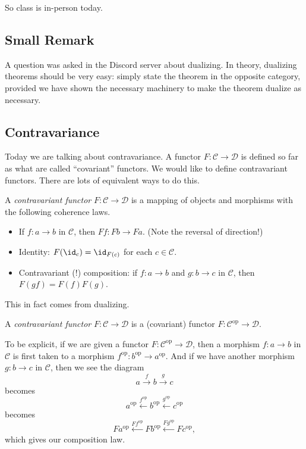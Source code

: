 \documentclass[../notes.tex]{subfiles}
\begin{document}

So class is in-person today.

\subsection{Small Remark}
A question was asked in the Discord server about dualizing. In theory, dualizing theorems should be very easy: simply state the theorem in the opposite category, provided we have shown the necessary machinery to make the theorem dualize as necessary.

\subsection{Contravariance}
Today we are talking about contravariance. A functor $F:\mathcal C\to\mathcal D$ is defined so far as what are called ``covariant'' functors. We would like to define contravariant functors. There are lots of equivalent ways to do this.
\begin{definition}[Contravariance, I]
	A \textit{contravariant functor} $F:\mathcal C\to\mathcal D$ is a mapping of objects and morphisms with the following coherence laws.
	\begin{itemize}
		\item If $f:a\to b$ in $\mathcal C$, then $Ff:Fb\to Fa$. (Note the reversal of direction!)
		\item Identity: $F(\id_c)=\id_{F(c)}$ for each $c\in\mathcal C$.
		\item Contravariant (!) composition: if $f:a\to b$ and $g:b\to c$ in $\mathcal C$, then $F(gf)=F(f)F(g)$.
	\end{itemize}
\end{definition}
This in fact comes from dualizing.
\begin{definition}[Contravariance, II] \label{def:contra}
	A \textit{contravariant functor} $F:\mathcal C\to\mathcal D$ is a (covariant) functor $F:\mathcal C^\mathrm{op}\to\mathcal D$.
\end{definition}
To be explicit, if we are given a functor $F:\mathcal C^\mathrm{op}\to\mathcal D$, then a morphism $f:a\to b$ in $\mathcal C$ is first taken to a morphism $f^\mathrm{op}:b^\mathrm{op}\to a^\mathrm{op}$. And if we have another morphism $g:b\to c$ in $\mathcal C$, then we see the diagram
\[a\stackrel f\to b\stackrel g\to c\]
becomes
\[a^\mathrm{op}\stackrel{f^\mathrm{op}}\leftarrow b^\mathrm{op}\stackrel{g^\mathrm{op}}\leftarrow c^\mathrm{op}\]
becomes
\[Fa^\mathrm{op}\stackrel{Ff^\mathrm{op}}\leftarrow Fb^\mathrm{op}\stackrel{Fg^\mathrm{op}}\leftarrow Fc^\mathrm{op},\]
which gives our composition law.
\end{document}
